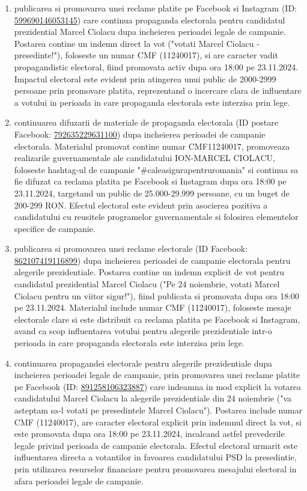 \documentclass[a4paper,12pt]{article}
\begin{document}
\begin{enumerate}[leftmargin=*, label=\arabic*.)]
    \item publicarea si promovarea unei reclame platite pe Facebook si Instagram (ID: \href{https://www.facebook.com/ads/library/?id=599690146053145}{599690146053145}) care continua propaganda electorala pentru candidatul prezidential Marcel Ciolacu dupa incheierea perioadei legale de campanie. Postarea contine un indemn direct la vot ("votati Marcel Ciolacu - presedinte!"), foloseste un numar CMF (11240017), si are caracter vadit propagandistic electoral, fiind promovata activ dupa ora 18:00 pe 23.11.2024. Impactul electoral este evident prin atingerea unui public de 2000-2999 persoane prin promovare platita, reprezentand o incercare clara de influentare a votului in perioada in care propaganda electorala este interzisa prin lege.
    \item continuarea difuzarii de materiale de propaganda electorala (ID postare Facebook: \href{https://www.facebook.com/ads/library/?id=792635229631100}{792635229631100}) dupa incheierea perioadei de campanie electorala. Materialul promovat contine numar CMF11240017, promoveaza realizarile guvernamentale ale candidatului ION-MARCEL CIOLACU, foloseste hashtag-ul de campanie "\#caleasigurapentruromania" si continua sa fie difuzat ca reclama platita pe Facebook si Instagram dupa ora 18:00 pe 23.11.2024, targetand un public de 25.000-29.999 persoane, cu un buget de 200-299 RON. Efectul electoral este evident prin asocierea pozitiva a candidatului cu reusitele programelor guvernamentale si folosirea elementelor specifice de campanie.
    \item publicarea si promovarea unei reclame electorale (ID Facebook: \href{https://www.facebook.com/ads/library/?id=862107419116899}{862107419116899}) dupa incheierea perioadei de campanie electorala pentru alegerile prezidentiale. Postarea contine un indemn explicit de vot pentru candidatul prezidential Marcel Ciolacu ("Pe 24 noiembrie, votati Marcel Ciolacu pentru un viitor sigur!"), fiind publicata si promovata dupa ora 18:00 pe 23.11.2024. Materialul include numar CMF (11240017), foloseste mesaje electorale clare si este distribuit ca reclama platita pe Facebook si Instagram, avand ca scop influentarea votului pentru alegerile prezidentiale intr-o perioada in care propaganda electorala este interzisa prin lege.
    \item continuarea propagandei electorale pentru alegerile prezidentiale dupa incheierea perioadei legale de campanie, prin promovarea unei reclame platite pe Facebook (ID: \href{https://www.facebook.com/ads/library/?id=891258106323887}{891258106323887}) care indeamna in mod explicit la votarea candidatului Marcel Ciolacu la alegerile prezidentiale din 24 noiembrie ("va asteptam sa-l votati pe presedintele Marcel Ciolacu"). Postarea include numar CMF (11240017), are caracter electoral explicit prin indemnul direct la vot, si este promovata dupa ora 18:00 pe 23.11.2024, incalcand astfel prevederile legale privind perioada de campanie electorala. Efectul electoral urmarit este influentarea directa a votantilor in favoarea candidatului PSD la presedintie, prin utilizarea resurselor financiare pentru promovarea mesajului electoral in afara perioadei legale de campanie.

\end{enumerate}
\end{document}
